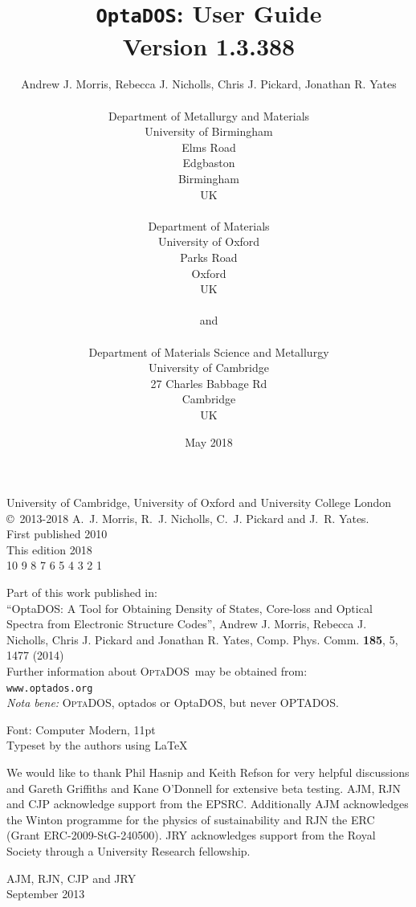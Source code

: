 \documentclass[a4paper,11pt,twoside]{book}
\title{{\huge {\tt OptaDOS}: User Guide}\\ {Version 1.3.388}}
\author{Andrew J. Morris, Rebecca J. Nicholls, Chris J. Pickard, Jonathan R. Yates \\
\\
Department of Metallurgy and Materials\\
University of Birmingham \\
Elms Road\\
Edgbaston\\
Birmingham\\
UK\\
\\
Department of Materials\\
University of Oxford\\
Parks Road\\
Oxford\\
UK \\
\\
{\small and} \\
\\
Department of Materials Science and Metallurgy\\
University of Cambridge\\
27 Charles Babbage Rd\\
Cambridge\\
UK\\
}
\date{May 2018}
\begin{document}
\newcommand{\optados}{\textsc{OptaDOS}}
\newcommand{\lindos}{\texttt{LinDOS}}
\newcommand{\onetep}{\textsc{onetep}}
\newcommand{\castep}{\textsc{castep}}
\maketitle

 \thispagestyle{empty}

\begin{centering}
\vspace*{40mm}
University of Cambridge, University of Oxford and University College London\\
\vspace{5mm}
\copyright\ 2013-2018 A.~J. Morris, R.~J. Nicholls, C.~J. Pickard and J.~R. Yates.\\
\vspace{5mm}
First published 2010\\
This edition 2018\\
\vspace{5mm}
10 9 8 7 6 5 4 3 2 1
\vspace{5mm}

Part of this work published in:\\
``OptaDOS: A Tool for Obtaining Density of States, Core-loss and Optical Spectra from Electronic Structure Codes'', Andrew J. Morris, Rebecca J. Nicholls, Chris J. Pickard and Jonathan R. Yates, Comp. Phys. Comm. {\bf 185}, 5, 1477 (2014)\\
\vspace{10mm}
Further information about \optados\ may be obtained from:\\ \texttt{www.optados.org}\\

\vspace{10mm}
\emph{Nota bene:} \optados, optados or OptaDOS, but never OPTADOS.

\null\vfill
\noindent
Font: Computer Modern, 11pt\\
Typeset by the authors using \LaTeX\, \\
\end{centering}
\newpage

\setcounter{tocdepth}{1}
\tableofcontents

\newpage
 \thispagestyle{empty}
\vspace*{50mm}
\begin{centering}
We would like to thank Phil Hasnip and Keith Refson for very helpful discussions and Gareth Griffiths and Kane O'Donnell for extensive beta testing.
 AJM, RJN and CJP acknowledge support from the EPSRC. Additionally AJM acknowledges
the Winton programme for the physics of sustainability and RJN the ERC
(Grant ERC-2009-StG-240500).
 JRY acknowledges support from the Royal Society through a University Research fellowship. 
\end{centering}
\begin{flushright}
AJM, RJN, CJP and JRY\\
September 2013
\end{flushright}
\newpage
\end{document}
